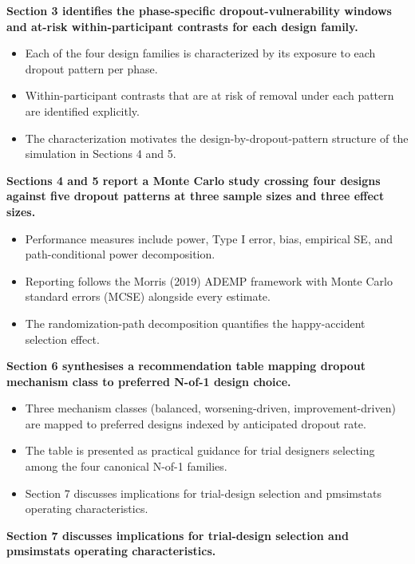 \documentclass[
  11pt,
]{article}
\begin{document}
\textbf{Section 3 identifies the phase-specific dropout-vulnerability windows and at-risk within-participant contrasts for each design family.}

\begin{itemize}\setlength{\itemsep}{2pt}\setlength{\parskip}{0pt}
\item Each of the four design families is characterized by its exposure to each dropout pattern per phase.
\item Within-participant contrasts that are at risk of removal under each pattern are identified explicitly.
\item The characterization motivates the design-by-dropout-pattern structure of the simulation in Sections 4 and 5.
\end{itemize}

\textbf{Sections 4 and 5 report a Monte Carlo study crossing four designs against five dropout patterns at three sample sizes and three effect sizes.}

\begin{itemize}\setlength{\itemsep}{2pt}\setlength{\parskip}{0pt}
\item Performance measures include power, Type I error, bias, empirical SE, and path-conditional power decomposition.
\item Reporting follows the Morris (2019) ADEMP framework with Monte Carlo standard errors (MCSE) alongside every estimate.
\item The randomization-path decomposition quantifies the happy-accident selection effect.
\end{itemize}

\textbf{Section 6 synthesises a recommendation table mapping dropout mechanism class to preferred N-of-1 design choice.}

\begin{itemize}\setlength{\itemsep}{2pt}\setlength{\parskip}{0pt}
\item Three mechanism classes (balanced, worsening-driven, improvement-driven) are mapped to preferred designs indexed by anticipated dropout rate.
\item The table is presented as practical guidance for trial designers selecting among the four canonical N-of-1 families.
\item Section 7 discusses implications for trial-design selection and pmsimstats operating characteristics.
\end{itemize}

\textbf{Section 7 discusses implications for trial-design selection and pmsimstats operating characteristics.}
\end{document}
